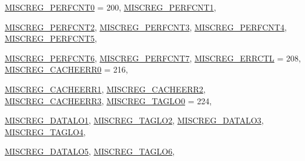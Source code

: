 \begin{DoxyCompactItemize}
\hyperlink{namespaceMipsISA_a1e522017e015d4c7efd6b2360143aa67aeec4b18af30cfb2f14b5754e044418c0}{MISCREG\_\-PERFCNT0} =  200, 
\hyperlink{namespaceMipsISA_a1e522017e015d4c7efd6b2360143aa67a82e7761bc297854e72a22f273a3940b9}{MISCREG\_\-PERFCNT1}, 
\par
\hyperlink{namespaceMipsISA_a1e522017e015d4c7efd6b2360143aa67a92c3e5fc444185d08063bacd0ee12ce9}{MISCREG\_\-PERFCNT2}, 
\hyperlink{namespaceMipsISA_a1e522017e015d4c7efd6b2360143aa67a3a6fcb7dc175fa2cae84d3125f1e4171}{MISCREG\_\-PERFCNT3}, 
\hyperlink{namespaceMipsISA_a1e522017e015d4c7efd6b2360143aa67a0a1569c2e5fa32f8022ae7f97ce037c7}{MISCREG\_\-PERFCNT4}, 
\hyperlink{namespaceMipsISA_a1e522017e015d4c7efd6b2360143aa67a78116dd46abb8942e57b60ab50382cb4}{MISCREG\_\-PERFCNT5}, 
\par
\hyperlink{namespaceMipsISA_a1e522017e015d4c7efd6b2360143aa67ad658bac60fa30d05c00d881586dbafb9}{MISCREG\_\-PERFCNT6}, 
\hyperlink{namespaceMipsISA_a1e522017e015d4c7efd6b2360143aa67a2d49c96ab0bf3b7161bb071e175e8b02}{MISCREG\_\-PERFCNT7}, 
\hyperlink{namespaceMipsISA_a1e522017e015d4c7efd6b2360143aa67a8af314b381ee5b7ce0ff91f4bd999e47}{MISCREG\_\-ERRCTL} =  208, 
\hyperlink{namespaceMipsISA_a1e522017e015d4c7efd6b2360143aa67a189b8ba2531e79278f3b93c43e5293a4}{MISCREG\_\-CACHEERR0} =  216, 
\par
\hyperlink{namespaceMipsISA_a1e522017e015d4c7efd6b2360143aa67a6cd7e3eff2dfacee9670e1b372010ea1}{MISCREG\_\-CACHEERR1}, 
\hyperlink{namespaceMipsISA_a1e522017e015d4c7efd6b2360143aa67ad1635a5a66d6eaff975e416e4ea08f40}{MISCREG\_\-CACHEERR2}, 
\hyperlink{namespaceMipsISA_a1e522017e015d4c7efd6b2360143aa67a059e9c9187b0061b193bb8afd16c212a}{MISCREG\_\-CACHEERR3}, 
\hyperlink{namespaceMipsISA_a1e522017e015d4c7efd6b2360143aa67a3d465188f3521f4c8e83ba5c1757ae48}{MISCREG\_\-TAGLO0} =  224, 
\par
\hyperlink{namespaceMipsISA_a1e522017e015d4c7efd6b2360143aa67a1b6b7702fbf4e3803807221865b532a5}{MISCREG\_\-DATALO1}, 
\hyperlink{namespaceMipsISA_a1e522017e015d4c7efd6b2360143aa67ad6df6a8c3e7d33114d6a404d3086f9d2}{MISCREG\_\-TAGLO2}, 
\hyperlink{namespaceMipsISA_a1e522017e015d4c7efd6b2360143aa67a8c70062aee6afee6c2d840a3cbab38cd}{MISCREG\_\-DATALO3}, 
\hyperlink{namespaceMipsISA_a1e522017e015d4c7efd6b2360143aa67a1e09b9f618f53031aff0984d6f0ab550}{MISCREG\_\-TAGLO4}, 
\par
\hyperlink{namespaceMipsISA_a1e522017e015d4c7efd6b2360143aa67ac8f1e507cbe5eec02b96eeebb34ea8e1}{MISCREG\_\-DATALO5}, 
\hyperlink{namespaceMipsISA_a1e522017e015d4c7efd6b2360143aa67aafcca6a7c7d5e822ee31b4025cb09b8b}{MISCREG\_\-TAGLO6}, 

\end{DoxyCompactItemize}
